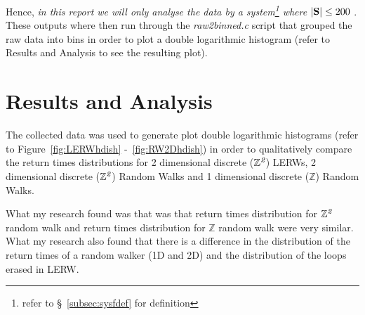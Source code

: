 \documentclass{article}
\begin{document}
Hence, \emph{in this report we will only analyse the data by a system\footnote{refer to \S~\ref{subsec:sysfdef} for definition} where} $|\vb{S}| \le 200$ .\newline
These outputs where then run through the \emph{raw2binned.c} script that grouped the raw data into bins in order to plot a double logarithmic histogram (refer to Results and Analysis to see the resulting plot).
\newpage
	

\section{Results and Analysis}
	The collected data was used to generate plot double logarithmic histograms (refer to Figure~\ref{fig:LERWhdish} -~\ref{fig:RW2Dhdish}) in order to qualitatively compare the return times distributions for 2 dimensional discrete ($\mathbb{Z}^{\emph{2}}$) LERWs,  2 dimensional discrete ($\mathbb{Z}^{\emph{2}}$)  Random Walks and 1 dimensional discrete ($\mathbb{Z}$) Random Walks. \newline

What my research found was that was that return times distribution for $\mathbb{Z}^{\emph{2}}$ random walk and return times distribution for $\mathbb{Z}$ random walk were very similar. What my research also found that there is a difference in the distribution of the return times of a random walker (1D and 2D)  and the distribution of the loops erased in LERW.
\end{document}
